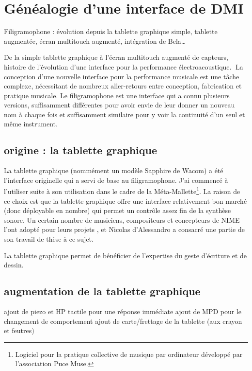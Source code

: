 \section{Généalogie d’une interface de DMI}
\label{sec:interfaces:sec1}

Filigramophone : évolution depuis la tablette graphique simple, tablette augmentée, écran multitouch augmenté, intégration de Bela…

De la simple tablette graphique à l’écran multitouch augmenté de capteurs, histoire de l’évolution d’une interface pour la performance électroacoustique.
La conception d’une nouvelle interface pour la performance musicale est une tâche complexe, nécessitant de nombreux aller-retours entre conception, fabrication et pratique musicale. Le filigramophone est une interface qui a connu plusieurs versions, suffisamment différentes pour avoir envie de leur donner un nouveau nom à chaque fois et suffisamment similaire pour y voir la continuité d’un seul et même instrument.

\subsection{origine : la tablette graphique}
La tablette graphique (nommément un modèle Sapphire de Wacom) a été l’interface originelle qui a servi de base au filigramophone. J’ai commencé à l’utiliser suite à son utilisation dans le cadre de la Méta-Mallette\footnote{Logiciel pour la pratique collective de musique par ordinateur développé par l’association Puce Muse.}. La raison de ce choix est que la tablette graphique offre une interface relativement bon marché (donc déployable en nombre) qui permet un contrôle assez fin de la synthèse sonore.
Un certain nombre de musiciens, compositeurs et concepteurs de NIME l’ont adopté pour leurs projets \cite{Zby07}, et Nicolas d’Alessandro a consacré une partie de son travail de thèse \cite{Ale09} à ce sujet.

La tablette graphique permet de bénéficier de l’expertise du geste d’écriture et de dessin.


\subsection{augmentation de la tablette graphique}
ajout de piezo et HP tactile pour une réponse immédiate
ajout de MPD pour le changement de comportement
ajout de carte/frettage de la tablette (aux crayon et feutres)

